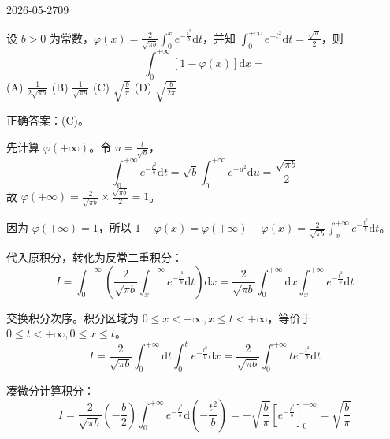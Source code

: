 \begin{mistake}{2026-05-27}{09}

\begin{problemcontent}
设 \( b>0 \) 为常数，\( \varphi(x) = \frac{2}{\sqrt{\pi b}} \int_{0}^{x} e^{-\frac{t^2}{b}} \mathrm{d}t \)，并知 \( \int_{0}^{+\infty} e^{-t^2} \mathrm{d}t = \frac{\sqrt{\pi}}{2} \)，则 
\[ \int_{0}^{+\infty} [1 - \varphi(x)] \mathrm{d}x = \]
(A) \( \frac{1}{2 \sqrt{\pi b}} \) \quad (B) \( \frac{1}{\sqrt{\pi b}} \) \quad (C) \( \sqrt{\frac{b}{\pi}} \) \quad (D) \( \sqrt{\frac{b}{2\pi}} \)
\end{problemcontent}

\begin{solutioncontent}
正确答案：(C)。

先计算 \( \varphi(+\infty) \)。令 \( u = \frac{t}{\sqrt{b}} \)，
\[ \int_{0}^{+\infty} e^{-\frac{t^2}{b}} \mathrm{d}t = \sqrt{b} \int_{0}^{+\infty} e^{-u^2} \mathrm{d}u = \frac{\sqrt{\pi b}}{2} \]
故 \( \varphi(+\infty) = \frac{2}{\sqrt{\pi b}} \times \frac{\sqrt{\pi b}}{2} = 1 \)。

因为 \( \varphi(+\infty) = 1 \)，所以 \( 1 - \varphi(x) = \varphi(+\infty) - \varphi(x) = \frac{2}{\sqrt{\pi b}} \int_{x}^{+\infty} e^{-\frac{t^2}{b}} \mathrm{d}t \)。

代入原积分，转化为反常二重积分：
\[ I = \int_{0}^{+\infty} \left( \frac{2}{\sqrt{\pi b}} \int_{x}^{+\infty} e^{-\frac{t^2}{b}} \mathrm{d}t \right) \mathrm{d}x = \frac{2}{\sqrt{\pi b}} \int_{0}^{+\infty} \mathrm{d}x \int_{x}^{+\infty} e^{-\frac{t^2}{b}} \mathrm{d}t \]

交换积分次序。积分区域为 \( 0 \le x < +\infty, x \le t < +\infty \)，等价于 \( 0 \le t < +\infty, 0 \le x \le t \)。
\[ I = \frac{2}{\sqrt{\pi b}} \int_{0}^{+\infty} \mathrm{d}t \int_{0}^{t} e^{-\frac{t^2}{b}} \mathrm{d}x = \frac{2}{\sqrt{\pi b}} \int_{0}^{+\infty} t e^{-\frac{t^2}{b}} \mathrm{d}t \]

凑微分计算积分：
\[ I = \frac{2}{\sqrt{\pi b}} \left( -\frac{b}{2} \right) \int_{0}^{+\infty} e^{-\frac{t^2}{b}} \mathrm{d}\left(-\frac{t^2}{b}\right) = -\sqrt{\frac{b}{\pi}} \left[ e^{-\frac{t^2}{b}} \right]_0^{+\infty} = \sqrt{\frac{b}{\pi}} \]
\end{solutioncontent}


\end{mistake}
